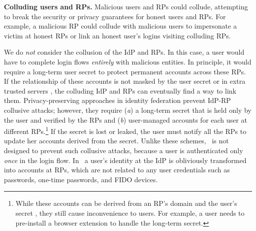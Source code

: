 \noindent \textbf{Colluding users and RPs.}
Malicious users and RPs could collude,
 attempting to break the security or privacy guarantees for honest users and RPs.
For example, a malicious RP could collude with malicious users to impersonate a victim at honest RPs or link an honest user's logins visiting colluding RPs.

We do \emph{not} consider the collusion of the IdP and RPs.
In this case, a user would have to complete login flows \emph{entirely} with malicious entities. 
In principle, it would require a long-term user secret to protect permanent accounts across these RPs.
If the relationship of these accounts is not masked by the user secret or in extra trusted servers \cite{miso},
 the colluding IdP and RPs can eventually find a way to link them.
Privacy-preserving approaches in identity federation \cite{ELPASSO, UnlimitID, idemix, PseudoID, Opaak, uprov} prevent IdP-RP collusive attacks;
however, they require (\emph{a}) a long-term secret that is held only by the user and verified by the RPs and (\emph{b}) user-managed accounts for each user at different RPs.\footnote{While these accounts can be derived from an RP's domain and the user's secret \cite{ELPASSO, UnlimitID, Opaak, uprov,idemix},
 they still cause inconvenience to users.
For example, a user needs to pre-install a browser extension to handle the long-term secret.}
If the secret is lost or leaked, the user must notify all the RPs to update her accounts derived from the secret.
Unlike these schemes, \usso\ is not designed to prevent such collusive attacks,
 because a user is authenticated only \emph{once} in the login flow.
In \usso\ a user's identity at the IdP is obliviously transformed into accounts at RPs,
 which are not related to any user credentials such as passwords, one-time passwords, %
  and FIDO devices.


